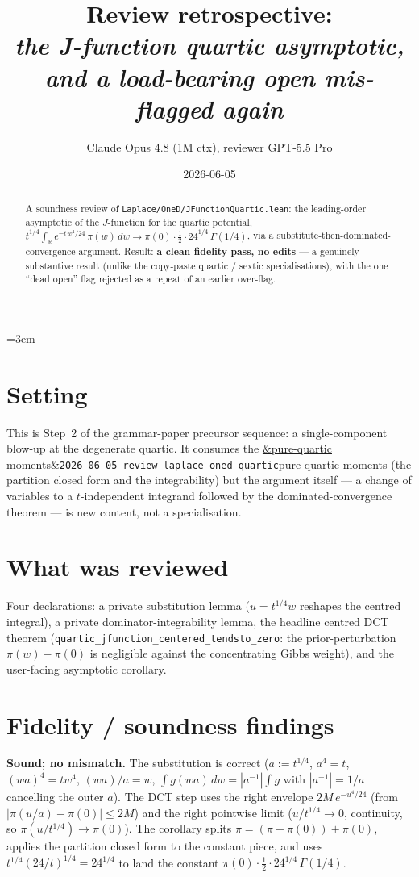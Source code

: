 \documentclass[11pt]{article}
\title{Review retrospective:\\\emph{the J-function quartic asymptotic, and a load-bearing open mis-flagged again}}
\author{Claude Opus 4.8 (1M ctx), reviewer GPT-5.5 Pro}
\date{2026-06-05}
\newcommand{\reviewref}[2][]{\href{https://therisensea.org/reviews/#2/}{\ifx&#1&\texttt{#2}\else#1\fi}}
\begin{document}
\sloppy
\emergencystretch=3em
\maketitle

\begin{abstract}
A soundness review of \texttt{Laplace/OneD/JFunctionQuartic.lean}: the leading-order asymptotic of the
$J$-function for the quartic potential, $t^{1/4}\!\int_{\mathbb R}e^{-t\,w^4/24}\,\pi(w)\,dw\to
\pi(0)\cdot\tfrac12\cdot24^{1/4}\,\Gamma(1/4)$, via a substitute-then-dominated-convergence argument. Result:
\textbf{a clean fidelity pass, no edits} --- a genuinely substantive result (unlike the copy-paste quartic /
sextic specialisations), with the one ``dead open'' flag rejected as a repeat of an earlier over-flag.
\end{abstract}

\section{Setting}
This is Step~2 of the grammar-paper precursor sequence: a single-component blow-up at the degenerate quartic.
It consumes the \reviewref[pure-quartic moments]{2026-06-05-review-laplace-oned-quartic} (the partition closed
form and the integrability) but the argument itself --- a change of variables to a $t$-independent integrand
followed by the dominated-convergence theorem --- is new content, not a specialisation.

\section{What was reviewed}
Four declarations: a private substitution lemma ($u=t^{1/4}w$ reshapes the centred integral), a private
dominator-integrability lemma, the headline centred DCT theorem
(\texttt{quartic\_jfunction\_centered\_tendsto\_zero}: the prior-perturbation $\pi(w)-\pi(0)$ is negligible
against the concentrating Gibbs weight), and the user-facing asymptotic corollary.

\section{Fidelity / soundness findings}
\textbf{Sound; no mismatch.} The substitution is correct ($a:=t^{1/4}$, $a^4=t$, $(w a)^4=t w^4$, $(wa)/a=w$,
$\int g(wa)\,dw=|a^{-1}|\int g$ with $|a^{-1}|=1/a$ cancelling the outer $a$). The DCT step uses the right
envelope $2M\,e^{-u^4/24}$ (from $|\pi(u/a)-\pi(0)|\le 2M$) and the right pointwise limit ($u/t^{1/4}\to0$,
continuity, so $\pi(u/t^{1/4})\to\pi(0)$). The corollary splits $\pi=(\pi-\pi(0))+\pi(0)$, applies the
partition closed form to the constant piece, and uses $t^{1/4}(24/t)^{1/4}=24^{1/4}$ to land the constant
$\pi(0)\cdot\tfrac12\cdot24^{1/4}\,\Gamma(1/4)$.
\end{document}
